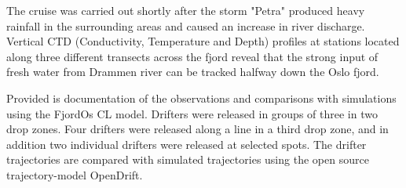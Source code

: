 \documentclass[12pt,a4paper,english]{article}
\begin{document}
The cruise was carried out shortly after the storm "Petra" produced heavy rainfall in the surrounding areas and caused an increase in river discharge. Vertical CTD (Conductivity, Temperature and Depth) profiles at stations located along three different transects across the fjord reveal that the strong input of fresh water from Drammen river can be tracked halfway down the Oslo fjord.

Provided is documentation of the observations and comparisons with simulations using the FjordOs CL model. Drifters were released in groups of three in two drop zones. Four drifters were released along a line in a third drop zone, and in addition two individual drifters were released at selected spots. The drifter trajectories are compared with simulated trajectories using the open source trajectory-model OpenDrift.

\clearpage

\vfill

\end{document}
